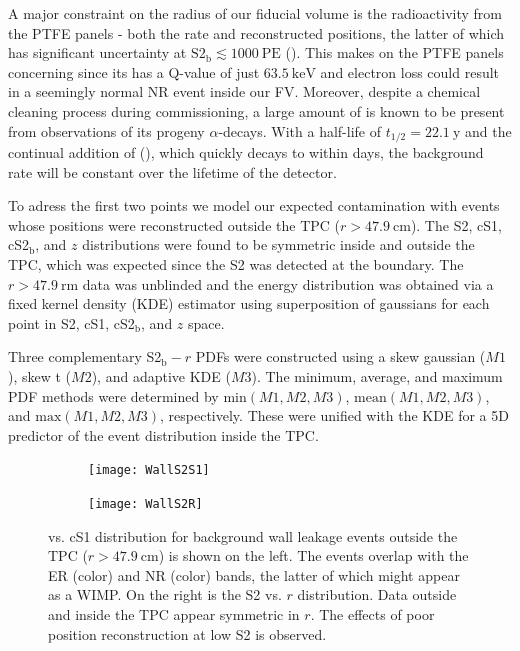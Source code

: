 A major constraint on the radius of our fiducial volume is the radioactivity from the PTFE panels - both the rate and reconstructed
positions, the latter of which has significant uncertainty at $\mathrm{S2_b} \lesssim 1000\ \mathrm{PE}$
().  This makes  on the PTFE panels concerning since its \betadecay has
a Q-value of just $63.5\ \mathrm{keV}$ and electron loss could result in a seemingly normal NR event inside our FV.  Moreover, despite a
chemical cleaning process during commissioning, a large amount of  is known to be present from observations of its progeny
 $\alpha$-decays.  With a half-life of $t_{1/2} = 22.1\ \mathrm{y}$ and the continual addition of 
(), which quickly decays to  within days, the background rate will be
constant over the lifetime of the detector.

To adress the first two points we model our expected contamination with events whose positions were reconstructed outside the
TPC ($r > 47.9\ \mathrm{cm}$).  The S2, cS1, cS2$_{\mathrm{b}}$, and $z$
distributions were found to be symmetric inside and outside the TPC, which was expected since the S2 was detected at the boundary.  The
$r > 47.9\ \mathrm{rm}$ data was unblinded and the energy distribution was obtained via a fixed kernel density (KDE) estimator using
superposition of gaussians for each point in S2, cS1, cS2$_{\mathrm{b}}$, and $z$ space.

Three complementary S2$_{\mathrm{b}} - r$ PDFs were
constructed using a skew gaussian ($M1$), skew t ($M2$), and adaptive KDE ($M3$).  The minimum, average, and maximum PDF methods were determined
by $\mathrm{min}(M1, M2, M3)$, $\mathrm{mean}(M1, M2, M3)$, and $\mathrm{max}(M1, M2, M3)$, respectively.  These were unified with the
KDE for a 5D predictor of the event distribution inside the TPC.

\begin{figure}
    \centering
    \begin{subfigure}[t]{0.5\textwidth}
        \centering
        \texttt{[image: WallS2S1]}
    \end{subfigure}%
    \begin{subfigure}[t]{0.5\textwidth}
        \centering
        \texttt{[image: WallS2R]}
    \end{subfigure}
    \caption{\cstwob vs. cS1 distribution for background wall leakage events outside the TPC ($r > 47.9\ \mathrm{cm}$) is shown on the
    left.  The events overlap with the ER (color) and NR (color) bands, the latter of which might appear as a WIMP.  On the right is
    the S2 vs. $r$ distribution.  Data outside and inside the TPC appear symmetric in $r$.  The effects of poor position reconstruction
    at low S2 is observed.}
	\label{fig:backgrounds_decay_chains}
\end{figure}

